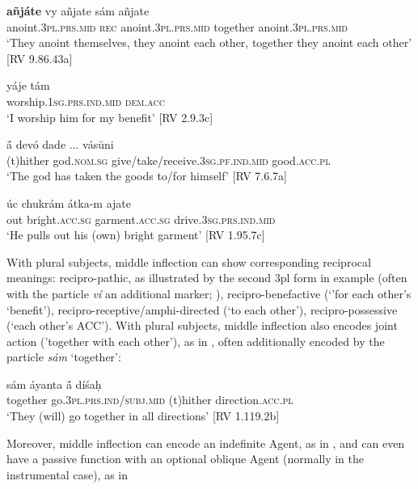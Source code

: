 \documentclass[output=paper]{langscibook}
\begin{document}
\ea%
 \label{ex:Orqueda:1}  
 \gll \textbf{{añjáte}} vy  añjate  sám  añjate\\
    anoint.3\textsc{pl.prs.mid}  \textsc{rec}  anoint.3\textsc{pl}.\textsc{prs.mid}  together  anoint.\textsc{3pl.prs.mid}\\
\glt ‘They anoint themselves, they anoint each other, together they anoint each other’ [RV 9.86.43a]
\z

\ea%
    \label{ex:Orqueda:2}
\gll yáje  tám\\
  worship.\textsc{1sg.prs.ind.mid}  \textsc{dem.acc}\\
\glt ‘I worship him for my benefit’ [RV 2.9.3c]
\z

\ea%
    \label{ex:Orqueda:3}
\gll \'{ā}  devó    dade ...  vásūni\\
  (t)hither  god.\textsc{nom.sg}  give/take/receive.\textsc{3sg.pf.ind.mid} { } good.\textsc{acc.pl}\\
\glt ‘The god has taken the goods to/for himself’ [RV 7.6.7a]
\z

\ea%
    \label{ex:Orqueda:4}
\gll úc  chukrám  átka-m  ajate\\
  out  bright.\textsc{acc.sg}  garment.\textsc{acc.sg}  drive.\textsc{3sg.prs.ind.mid}\\
\glt ‘He pulls out his (own) bright garment’ [RV 1.95.7c]
\z

{With plural subjects, middle inflection can show corresponding reciprocal meanings: {recipro-pathic}, as illustrated by the second 3pl form in example  (often with the particle \textit{ví} an additional marker; \citealt{Kulikov2007Reciprocal}), {recipro-benefactive} (‘'for each other’s ‘benefit’), {recipro-receptive/amphi-directed} (‘to each other’), {recipro-possessive} (‘each other’s ACC’). With plural subjects, middle inflection also encodes {joint} {action} ('together with each other'), as in , often additionally encoded by the particle \textit{sám} ‘together’:}

\ea%
    \label{ex:Orqueda:5}
\gll sám  áyanta  \'{ā}  díśaḥ\\
  together  go.\textsc{3pl.prs.ind/subj.mid}  (t)hither  direction.\textsc{acc.pl}\\
\glt ‘They (will) go together in all directions’ [RV 1.119.2b]
\z

Moreover, middle inflection can encode an {indefinite} {Agent}, as in , and can even have a passive function with an optional oblique Agent (normally in the instrumental case), as in 
\end{document}
